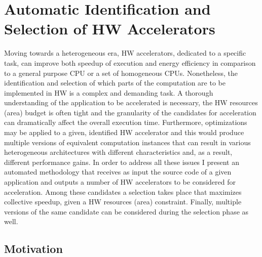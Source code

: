 \documentclass[]{usiinfthesis}
\begin{document}

%
%
%
%
%  
%
%
%
%
%

\chapter%
{Automatic Identification and Selection of HW Accelerators}

Moving towards a heterogeneous era, HW accelerators, dedicated to a specific task, can
improve both speedup of execution and energy efficiency in comparison to a general 
purpose CPU or a set of homogeneous CPUs. Nonetheless, the identification and selection 
of which parts of the computation are to be implemented in HW is a complex and demanding task. 
A thorough understanding of the application to be accelerated is necessary, the HW resources
(area) budget is often tight and the granularity of the candidates for acceleration 
can dramatically affect the overall execution time. Furthermore, optimizations may be applied
to a given, identified HW accelerator and this would produce multiple versions of equivalent
computation instances that can result in various heterogeneous architectures with different
characteristics and, as a result, different performance gains.
In order to address all these issues I present an automated methodology
that receives as input the source code of a given application and outputs a number of 
HW accelerators to be considered for acceleration. Among these candidates a selection takes 
place that maximizes collective speedup, given a HW resources (area) constraint. Finally, 
multiple versions of the same candidate can be considered during the selection phase as well.

\section{Motivation}
\label{sec:mot}
\end{document}
